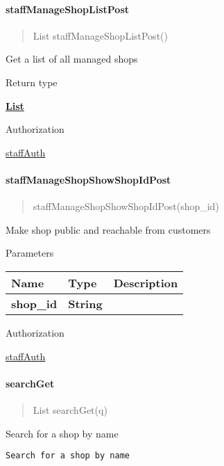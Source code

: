 \hypertarget{staffmanageshoplistpost}{%
\paragraph{\texorpdfstring{\textbf{staffManageShopListPost}}{staffManageShopListPost}}\label{staffmanageshoplistpost}}

\begin{quote}
List staffManageShopListPost()
\end{quote}

Get a list of all managed shops

Return type

\href{../Models/SearchResult.md}{\textbf{List}}

Authorization

\href{../README.md\#staffAuth}{staffAuth}

\hypertarget{staffmanageshopshowshopidpost}{%
\paragraph{\texorpdfstring{\textbf{staffManageShopShowShopIdPost}}{staffManageShopShowShopIdPost}}\label{staffmanageshopshowshopidpost}}

\begin{quote}
staffManageShopShowShopIdPost(shop\_id)
\end{quote}

Make shop public and reachable from customers

Parameters

\begin{longtable}[]{@{}lll@{}}
\toprule
Name & Type & Description\tabularnewline
\midrule
\endhead
\textbf{shop\_id} & \textbf{String} &\tabularnewline
\bottomrule
\end{longtable}

Authorization

\href{../README.md\#staffAuth}{staffAuth}

\hypertarget{searchget}{%
\paragraph{\texorpdfstring{\textbf{searchGet}}{searchGet}}\label{searchget}}

\begin{quote}
List searchGet(q)
\end{quote}

Search for a shop by name

\begin{verbatim}
Search for a shop by name
\end{verbatim}

